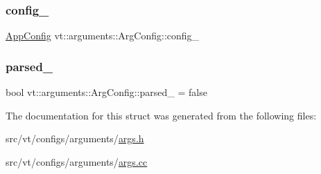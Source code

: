 \subsubsection{\texorpdfstring{config\+\_\+}{config\_}}
{\footnotesize\ttfamily \hyperlink{structvt_1_1arguments_1_1_app_config}{App\+Config} vt\+::arguments\+::\+Arg\+Config\+::config\+\_\+}

\mbox{\label{structvt_1_1arguments_1_1_arg_config_a710f4894651d38778f924c5d5f340d96}} 
\subsubsection{\texorpdfstring{parsed\+\_\+}{parsed\_}}
{\footnotesize\ttfamily bool vt\+::arguments\+::\+Arg\+Config\+::parsed\+\_\+ = false\hspace{0.3cm}{\ttfamily [private]}}



The documentation for this struct was generated from the following files\+:\begin{DoxyCompactItemize}
\item 
src/vt/configs/arguments/\hyperlink{args_8h}{args.\+h}\item 
src/vt/configs/arguments/\hyperlink{args_8cc}{args.\+cc}\end{DoxyCompactItemize}
